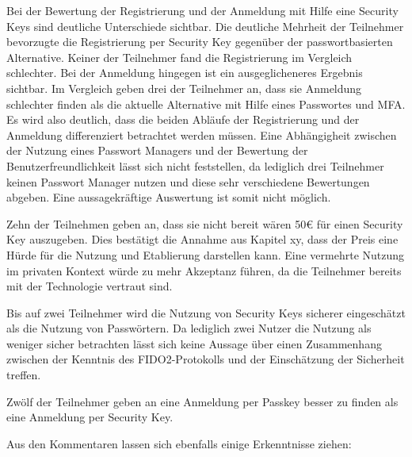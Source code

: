 Bei der Bewertung der Registrierung und der Anmeldung mit Hilfe eine Security Keys sind deutliche Unterschiede sichtbar. Die deutliche Mehrheit der Teilnehmer bevorzugte die Registrierung per Security Key gegenüber der passwortbasierten Alternative. Keiner der Teilnehmer fand die Registrierung im Vergleich schlechter. Bei der Anmeldung hingegen ist ein ausgeglicheneres Ergebnis sichtbar. Im Vergleich geben drei der Teilnehmer an, dass sie Anmeldung schlechter finden als die aktuelle Alternative mit Hilfe eines Passwortes und \ac{MFA}. Es wird also deutlich, dass die beiden Abläufe der Registrierung und der Anmeldung differenziert betrachtet werden müssen. 
Eine Abhängigheit zwischen der Nutzung eines Passwort Managers und der Bewertung der Benutzerfreundlichkeit lässt sich nicht feststellen, da lediglich drei Teilnehmer keinen Passwort Manager nutzen und diese sehr verschiedene Bewertungen abgeben. Eine aussagekräftige Auswertung ist somit nicht möglich. 


Zehn der Teilnehmen geben an, dass sie nicht bereit wären 50€ für einen Security Key auszugeben. Dies bestätigt die Annahme aus Kapitel xy, dass der Preis eine Hürde für die Nutzung und Etablierung darstellen kann. Eine vermehrte Nutzung im privaten Kontext würde zu mehr Akzeptanz führen, da die Teilnehmer bereits mit der Technologie vertraut sind. 

Bis auf zwei Teilnehmer wird die Nutzung von Security Keys sicherer eingeschätzt als die Nutzung von Passwörtern. Da lediglich zwei Nutzer die Nutzung als weniger sicher betrachten lässt sich keine Aussage über einen Zusammenhang zwischen der Kenntnis des FIDO2-Protokolls und der Einschätzung der Sicherheit treffen.

Zwölf der Teilnehmer geben an eine Anmeldung per Passkey besser zu finden als eine Anmeldung per Security Key. 

Aus den Kommentaren lassen sich ebenfalls einige Erkenntnisse ziehen:

